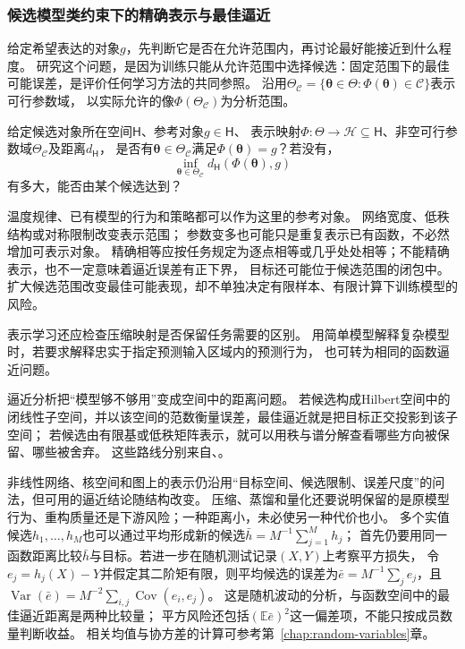 \subsubsection{候选模型类约束下的精确表示与最佳逼近}
\label{sec:future-analysis-representation}

给定希望表达的对象$g$，先判断它是否在允许范围内，再讨论最好能接近到什么程度。
研究这个问题，是因为训练只能从允许范围中选择候选：固定范围下的最佳可能误差，是评价任何学习方法的共同参照。
沿用$\Theta_{\mathcal C}=\{\bm\theta\in\Theta:\Phi(\bm\theta)\in\mathcal C\}$表示可行参数域，
以实际允许的像$\Phi(\Theta_{\mathcal C})$为分析范围。

\begin{mathproblem}[目标的表示与逼近]
  \label{question:future-representation}
  给定候选对象所在空间$\mathsf H$、参考对象$g\in\mathsf H$、
  表示映射$\Phi:\Theta\to\mathcal H\subseteq\mathsf H$、非空可行参数域$\Theta_{\mathcal C}$及距离$d_{\mathsf H}$，
  是否有$\bm\theta\in\Theta_{\mathcal C}$满足$\Phi(\bm\theta)=g$？若没有，
  \[
    \inf_{\bm\theta\in\Theta_{\mathcal C}}
      d_{\mathsf H}(\Phi(\bm\theta),g)
  \]
  有多大，能否由某个候选达到？
\end{mathproblem}

温度规律、已有模型的行为和策略都可以作为这里的参考对象。
网络宽度、低秩结构或对称限制改变表示范围；
参数变多也可能只是重复表示已有函数，不必然增加可表示对象。
精确相等应按任务规定为逐点相等或几乎处处相等；不能精确表示，也不一定意味着逼近误差有正下界，
目标还可能位于候选范围的闭包中。扩大候选范围改变最佳可能表现，却不单独决定有限样本、有限计算下训练模型的风险。

表示学习还应检查压缩映射是否保留任务需要的区别。
用简单模型解释复杂模型时，若要求解释忠实于指定预测输入区域内的预测行为，
也可转为相同的函数逼近问题。

逼近分析把“模型够不够用”变成空间中的距离问题。
若候选构成Hilbert空间中的闭线性子空间，并以该空间的范数衡量误差，最佳逼近就是把目标正交投影到该子空间；
若候选由有限基或低秩矩阵表示，就可以用秩与谱分解查看哪些方向被保留、哪些被舍弃。
这些路线分别来自、。

非线性网络、核空间和图上的表示仍沿用“目标空间、候选限制、误差尺度”的问法，但可用的逼近结论随结构改变。
压缩、蒸馏和量化还要说明保留的是原模型行为、重构质量还是下游风险；一种距离小，未必使另一种代价也小。
多个实值候选$h_1,\ldots,h_M$也可以通过平均形成新的候选$\bar h=M^{-1}\sum_{j=1}^M h_j$；
首先仍要用同一函数距离比较$\bar h$与目标。若进一步在随机测试记录$(X,Y)$上考察平方损失，
令$e_j=h_j(X)-Y$并假定其二阶矩有限，则平均候选的误差为$\bar e=M^{-1}\sum_j e_j$，且
$\operatorname{Var}(\bar e)=M^{-2}\sum_{i,j}\operatorname{Cov}(e_i,e_j)$。
这是随机波动的分析，与函数空间中的最佳逼近距离是两种比较量；
平方风险还包括$(\mathbb E\bar e)^2$这一偏差项，不能只按成员数量判断收益。
相关均值与协方差的计算可参考第~\ref{chap:random-variables}章。

